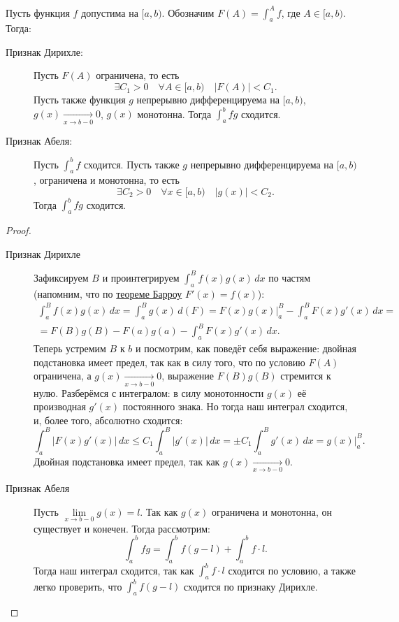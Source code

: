 \begin{theorem}
	Пусть функция \(f\) допустима на \([a, b)\). Обозначим \(F(A) = \int_a^A f\), где \(A \in [a, b)\). Тогда:
	\begin{description}
		\item[Признак Дирихле:] Пусть \(F(A)\) ограничена, то есть \[
		\exists C_1 > 0 \quad \forall A \in [a, b) \quad |F(A)| < C_1.
		\]
		Пусть также функция \(g\) непрерывно дифференцируема на \([a, b)\), \(g(x) \xrightarrow[x \to b-0]{} 0\), \(g(x)\) монотонна. Тогда \(\int_a^b fg\) сходится.
		\item[Признак Абеля:] Пусть \(\int_a^b f\) сходится. Пусть также \(g\) непрерывно дифференцируема на \([a, b)\), ограничена и монотонна, то есть \[
		\exists C_2 > 0 \quad \forall x \in [a, b) \quad |g(x)| < C_2.
		\]
		Тогда \(\int_a^b fg\) сходится. 
	\end{description} 
\end{theorem}
\begin{proof}
	\begin{description}
		\item[Признак Дирихле] Зафиксируем \(B\) и проинтегрируем \(\displaystyle \int_a^B f(x)g(x) \, dx\) по частям (напомним, что по \hyperlink{t8}{теореме Барроу} \(F'(x) = f(x)\)):
		\begin{multline*}
			\int_a^B f(x)g(x) \, dx = \int_a^B g(x) \, d(F) = F(x)g(x) \bigg|_a^B -\int_a^B F(x)g'(x) \, dx = \\
			= F(B)g(B) - F(a)g(a) - \int_a^B F(x)g'(x) \, dx.
		\end{multline*}
		Теперь устремим \(B\) к \(b\) и посмотрим, как поведёт себя выражение: двойная подстановка имеет предел, так как в силу того, что по условию \(F(A)\) ограничена, а \(g(x) \xrightarrow[x \to b-0]{} 0\), выражение \(F(B)g(B)\) стремится к нулю. Разберёмся с интегралом: в силу монотонности \(g(x)\) её производная \(g'(x)\) постоянного знака. Но тогда наш интеграл сходится, и, более того, абсолютно сходится: \[
		\int_a^B |F(x)g'(x)| \, dx \leqslant C_1 \int_a^B |g'(x)| \, dx = \pm C_1 \int_a^B g'(x) \, dx = g(x) \bigg|_a^B.
		\]
		Двойная подстановка имеет предел, так как \(g(x) \xrightarrow[x \to b-0]{} 0\).
		\item[Признак Абеля] Пусть \(\lim\limits_{x \to b-0} g(x) = l\). Так как \(g(x)\) ограничена и монотонна, он существует и конечен. Тогда рассмотрим: \[
		\int_a^b fg = \int_a^b f(g - l) + \int_a^b f \cdot l.
		\]
		Тогда наш интеграл сходится, так как \(\int_a^b f \cdot l\) сходится по условию, а также легко проверить, что \(\int_a^b f(g - l)\) сходится по признаку Дирихле.
	\end{description}
\end{proof}

